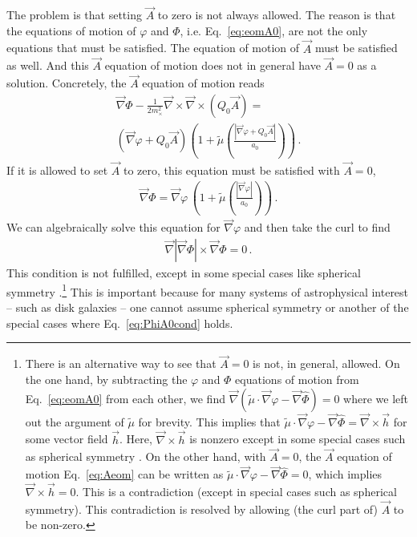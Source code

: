 \documentclass[reprint, amsmath,amssymb, nofootinbib, aps, prd]{revtex4-2}
\begin{document}
The problem is that setting $\vec{A}$ to zero is not always allowed.
The reason is that the equations of motion of $\varphi$ and $\Phi$, i.e. Eq.~\eqref{eq:eomA0}, are not the only equations that must be satisfied.
The equation of motion of $\vec{A}$ must be satisfied as well.
And this $\vec{A}$ equation of motion does not in general have $\vec{A} = 0$ as a solution.
Concretely, the $\vec{A}$ equation of motion reads
\begin{multline}
\label{eq:Aeom}
\vec{\nabla} \Phi - \frac1{2 m_\times^2} \vec{\nabla} \times \vec{\nabla} \times (Q_0 \vec{A}) = \\
(\vec{\nabla} \varphi + Q_0 \vec{A}) \left(1 + \tilde{\mu}\left(\frac{|\vec{\nabla} \varphi + Q_0 \vec{A}|}{a_0}\right)\right) \,.
\end{multline}
If it is allowed to set $\vec{A}$ to zero, this equation must be satisfied with $\vec{A} = 0$,
\begin{align}
 \label{eq:AeqA0}
\vec{\nabla} \Phi = \vec{\nabla} \varphi \, \left(1 + \tilde{\mu}\left(\frac{|\vec{\nabla} \varphi|}{a_0} \right)\right) \,.
\end{align}
We can algebraically solve this equation for $\vec{\nabla} \varphi$ and then take the curl to find
\begin{align}
 \label{eq:PhiA0cond}
 \vec{\nabla} |\vec{\nabla} \Phi| \times \vec{\nabla} \Phi = 0 \,.
\end{align}
This condition is not fulfilled, except in some special cases like spherical symmetry \citep{Brada1995}.\footnote{
  There is an alternative way to see that $\vec{A} = 0$ is not, in general, allowed.
  On the one hand, by subtracting the $\varphi$ and $\Phi$ equations of motion from Eq.~\eqref{eq:eomA0} from each other, we find $\vec{\nabla} \left( \tilde{\mu} \cdot \vec{\nabla} \varphi - \vec{\nabla} \hat{\Phi}\right) = 0$ where we left out the argument of $\tilde{\mu}$ for brevity.
  This implies that $\tilde{\mu} \cdot \vec{\nabla} \varphi - \vec{\nabla} \hat{\Phi} = \vec{\nabla} \times \vec{h}$ for some vector field $\vec{h}$.
  Here, $\vec{\nabla} \times \vec{h}$ is nonzero except in some special cases such as spherical symmetry \citep{Bekenstein1984}.
  On the other hand, with $\vec{A} = 0$, the $\vec{A}$ equation of motion Eq.~\eqref{eq:Aeom} can be written as $\tilde{\mu} \cdot \vec{\nabla} \varphi - \vec{\nabla} \hat{\Phi} = 0$, which implies $\vec{\nabla} \times \vec{h} = 0$.
  This is a contradiction (except in special cases such as spherical symmetry).
  This contradiction is resolved by allowing (the curl part of) $\vec{A}$ to be non-zero.
}
This is important because for many systems of astrophysical interest -- such as disk galaxies -- one cannot assume spherical symmetry or another of the special cases where Eq.~\eqref{eq:PhiA0cond} holds.
\end{document}
